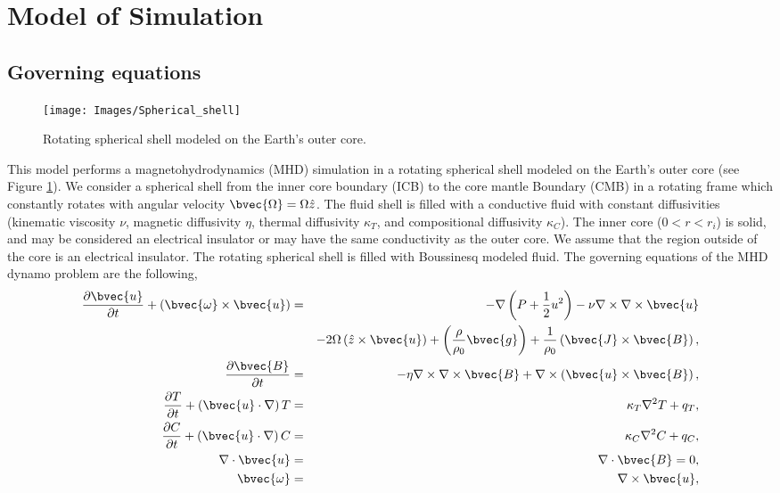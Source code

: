 \section{Model of Simulation}
\subsection{Governing equations}
%
\begin{figure}[htbp]
\begin{center}
\texttt{[image: Images/Spherical\_shell]}
\end{center}
\caption{Rotating spherical shell modeled on the Earth's outer core.}
\label{fig:shell}
\end{figure}
%
This model performs a magnetohydrodynamics (MHD) simulation in a rotating spherical shell modeled on the Earth's outer core (see Figure \ref{fig:shell}). We consider a spherical shell from the inner core boundary (ICB) to the core mantle Boundary (CMB) in a rotating frame which constantly rotates with angular velocity $\bvec{\Omega} = \Omega \hat{z}$. The fluid shell is filled with a conductive fluid with constant diffusivities (kinematic viscosity $\nu$, magnetic diffusivity $\eta$, thermal diffusivity $\kappa_{T}$, and compositional diffusivity $\kappa_{C}$). The inner core ($0 < r < r_{i}$) is solid, and may be considered an electrical insulator  or may have the same conductivity as the outer core. We assume that the region outside of the core is an electrical insulator. The rotating spherical shell is filled with Boussinesq modeled fluid. The governing equations of the MHD dynamo problem are the following,
%
\begin{eqnarray}
\frac{\partial \bvec{u}}{\partial t} + \left(\bvec{\omega} \times \bvec{u}\right)
 & = & - \nabla \left(P+\frac{1}{2}u^{2} \right) -\nu \nabla \times \nabla \times \bvec{u}
\nonumber \\
 & &  - 2 \Omega \left(\hat{z} \times \bvec{u} \right)
     + \left( \frac{\rho}{\rho_{0}} \bvec{g} \right)
     + \frac{1}{\rho_{0}} \left(\bvec{J} \times \bvec{B} \right),
\label{eq:momentum} \\
%
 \frac{\partial \bvec{B}}{\partial t}
 & = & -\eta \nabla \times \nabla \times \bvec{B}
       + \nabla \times \left(\bvec{u} \times \bvec{B} \right),
\label{eq:induction} \\
%
\frac{\partial T}{\partial t} + \left(\bvec{u} \cdot \nabla \right) T
 & = & \kappa_{T} \nabla^{2} T + q_{T},
\label{eq:heat} \\
%
\frac{\partial C}{\partial t} + \left(\bvec{u} \cdot \nabla \right) C
 & = & \kappa_{C} \nabla^{2} C + q_{C},
\label{eq:composition} \\
\nabla \cdot \bvec{u} & = & \nabla \cdot \bvec{B} = 0,
\label{eq:conservation} \\
%
\bvec{\omega} & = & \nabla \times \bvec{u},
\label{eq:def_vorticity}
\end{eqnarray}
